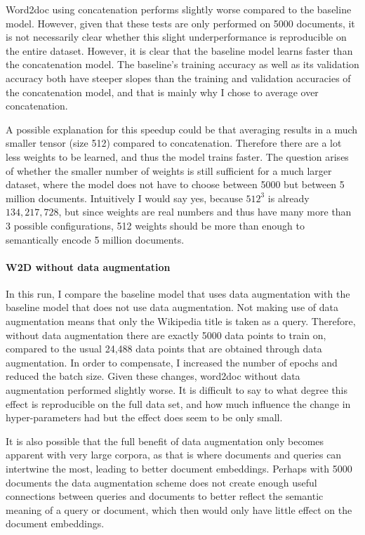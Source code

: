 Word2doc using concatenation performs slightly worse compared to the baseline model. However, given that these tests are only
performed on 5000 documents, it is not necessarily clear whether this slight underperformance is reproducible on the entire dataset.
However, it is clear that the baseline model learns faster than the concatenation model. The baseline's training accuracy as well
as its validation accuracy both have steeper slopes than the training and validation accuracies of the concatenation model, and
that is mainly why I chose to average over concatenation.

A possible explanation for this speedup could be that averaging results in a much smaller tensor (size 512) compared to
concatenation. Therefore there are a lot less weights to be learned, and thus the model trains faster. The question arises of whether the
smaller number of weights is still sufficient for a much larger dataset, where the model does not have to choose between 5000 but
between 5 million documents. Intuitively I would say yes, because $512^3$ is already $134,217,728$, but since weights are real
numbers and thus have many more than 3 possible configurations, 512 weights should be more than enough to semantically encode 5
million documents.

\paragraph{W2D without data augmentation}
In this run, I compare the baseline model that uses data augmentation with the baseline model that does not use data augmentation.
Not making use of data augmentation means that only the Wikipedia title is taken as a query. Therefore, without data augmentation there are
exactly 5000 data points to train on, compared to the usual 24,488 data points that are obtained through data augmentation. In
order to compensate, I increased the number of epochs and reduced the batch size. Given these changes, word2doc without data
augmentation performed slightly worse. It is difficult to say to what degree this effect is reproducible on the full data set,
and how much influence the change in hyper-parameters had but the effect does seem to be only small.

It is also possible that the full benefit of data augmentation only becomes apparent with very large corpora, as that is where
documents and queries can intertwine the most, leading to better document embeddings. Perhaps with 5000 documents the data
augmentation scheme does not create enough useful connections between queries and documents to better reflect the semantic
meaning of a query or document, which then would only have little effect on the document embeddings.

